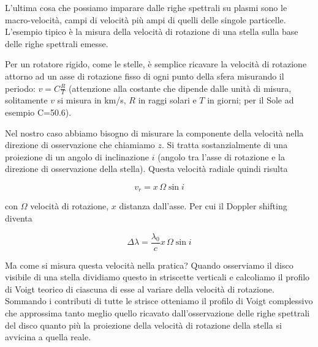 \vspace{0.2cm}L'ultima cosa che possiamo imparare dalle righe spettrali su plasmi sono le macro-velocità, campi di velocità più ampi di quelli delle singole particelle. L'esempio tipico è la misura della velocità di rotazione di una stella sulla base delle righe spettrali emesse.

Per un rotatore rigido, come le stelle, è semplice ricavare la velocità di rotazione attorno ad un asse di rotazione fisso di ogni punto della sfera misurando il periodo: $v=C\frac{R}{T}$ (attenzione alla costante che dipende dalle unità di misura, solitamente $v$ si misura in km/s, $R$ in raggi solari e $T$ in giorni; per il Sole ad esempio C=50.6).

Nel nostro caso abbiamo bisogno di misurare la  componente della velocità nella direzione di osservazione che chiamiamo $z$. Si tratta sostanzialmente di una proiezione di un angolo di inclinazione $i$ (angolo tra l'asse di rotazione e la direzione di osservazione della stella). Questa velocità radiale quindi risulta

$$v_r=x \, \Omega \sin{i}$$

con $\Omega$ velocità di rotazione, $x$ distanza dall'asse. Per cui il Doppler shifting diventa

$$\Delta \lambda=\frac{\lambda_0}{c} x \, \Omega \sin{i}$$

Ma come si misura questa velocità nella pratica? Quando osserviamo il disco visibile di una stella dividiamo questo in striscette verticali e calcoliamo il profilo di Voigt teorico di ciascuna di esse al variare della velocità di rotazione. Sommando i contributi di tutte le strisce otteniamo il profilo di Voigt complessivo che approssima tanto meglio quello ricavato dall'osservazione delle righe spettrali del disco quanto più la proiezione della velocità di rotazione della stella si avvicina a quella reale.